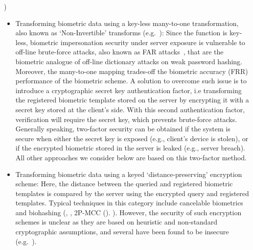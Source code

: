 \cite{jain2008biometric}) \begin{itemize} \item Transforming biometric data
  using a key-less many-to-one transformation, also known as `Non-Invertible'
  transforms (e.g.~\cite{ratha2007generating}): Since the function is key-less,
  biometric impersonation security under server exposure is vulnerable to
  off-line brute-force attacks, also known as FAR
  attacks~\cite{uludag2004attacks,roberts2007biometric}, that are the biometric
  analogue of off-line dictionary attacks on weak password hashing. Moreover,
  the many-to-one mapping trades-off the biometric accuracy (FRR) performance of
  the biometric scheme. A solution to overcome such issue is to introduce a
  cryptographic secret key authentication factor, i.e transforming the
  registered biometric template stored on the server by encrypting it with a
  secret key stored at the client's side. With this second authentication
  factor, verification will require the secret key, which prevents brute-force
  attacks. Generally speaking, two-factor security can be obtained if the system
  is secure when either the secret key is exposed (e.g., client's device is
  stolen), or if the encrypted biometric stored in the server is leaked (e.g.,
  server breach). All other approaches we consider below are based on this
  two-factor method.


\item Transforming biometric data using a keyed `distance-preserving' encryption scheme:  Here, the distance between the queried and registered biometric templates is compared by the server using the encrypted query and registered templates.  Typical techniques in this category include
            cancelable biometrics and biohashing (\cite{teoh2008cancellable}, \cite{jin2004biohashing}, 2P-MCC (\cite{cappelli2010minutia}). %
). However, the security of such encryption schemes is unclear as they are based on heuristic and non-standard cryptographic assumptions, and several have been found to be insecure (e.g.~\cite{lee2009inverse,lacharme2013preimage}).


\end{itemize}
